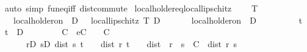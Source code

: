 \begin{isabellebody}
\ {\isacharparenleft}{\kern0pt}auto\ simp{\isacharcolon}{\kern0pt}\ fun{\isacharunderscore}{\kern0pt}eq{\isacharunderscore}{\kern0pt}iff\ dist{\isacharunderscore}{\kern0pt}commute{\isacharparenright}{\kern0pt}%
\endisatagproof
{\isafoldproof}%
%
\isadelimproof
\isanewline
%
\endisadelimproof
\isanewline
{}\isamarkupfalse%
\ local{\isacharunderscore}{\kern0pt}holder{\isacharunderscore}{\kern0pt}{}{\isacharunderscore}{\kern0pt}eq{\isacharunderscore}{\kern0pt}local{\isacharunderscore}{\kern0pt}lipschitz{\isacharcolon}{\kern0pt}\ \isanewline
\ \ \ {\isachardoublequoteopen}T\ {\isasymnoteq}\ {\isacharbraceleft}{\kern0pt}{\isacharbraceright}{\kern0pt}{\isachardoublequoteclose}\isanewline
\ \ \ {\isachardoublequoteopen}local{\isacharunderscore}{\kern0pt}holder{\isacharunderscore}{\kern0pt}on\ {}\ D\ {\isasymphi}\ {\isacharequal}{\kern0pt}\ local{\isacharunderscore}{\kern0pt}lipschitz\ T\ D\ {\isacharparenleft}{\kern0pt}{\isasymlambda}{\isacharunderscore}{\kern0pt}{\isachardot}{\kern0pt}\ {\isasymphi}{\isacharparenright}{\kern0pt}{\isachardoublequoteclose}\isanewline
%
\isadelimproof
%
\endisadelimproof
%
\isatagproof
{}\isamarkupfalse%
\isanewline
\ \ \isamarkupfalse%
\ {\isacharasterisk}{\kern0pt}{\isacharcolon}{\kern0pt}\ {\isachardoublequoteopen}local{\isacharunderscore}{\kern0pt}holder{\isacharunderscore}{\kern0pt}on\ {}\ D\ {\isasymphi}{\isachardoublequoteclose}\isanewline
\ \ \isacommand{{\isacharbraceleft}{\kern0pt}}\isamarkupfalse%
\isanewline
\ \ \ \ \isamarkupfalse%
\ t\ \isamarkupfalse%
\ {\isachardoublequoteopen}t\ {\isasymin}\ D{\isachardoublequoteclose}\isanewline
\ \ \ \ \isamarkupfalse%
\ \isamarkupfalse%
\ {\isasymepsilon}\ C\ \ eC{\isacharcolon}{\kern0pt}\ {\isachardoublequoteopen}{\isasymepsilon}\ {\isachargreater}{\kern0pt}\ {}{\isachardoublequoteclose}\ {\isachardoublequoteopen}C\ {\isasymge}\ {}{\isachardoublequoteclose}\isanewline
\ \ \ \ \ \ {\isachardoublequoteopen}{\isacharparenleft}{\kern0pt}{\isasymforall}r{\isasymin}D{\isachardot}{\kern0pt}\ {\isasymforall}s{\isasymin}D{\isachardot}{\kern0pt}\ dist\ s\ t\ {\isasymle}\ {\isasymepsilon}\ {\isasymand}\ dist\ r\ t\ {\isasymle}\ {\isasymepsilon}\ {\isasymlongrightarrow}\ dist\ {\isacharparenleft}{\kern0pt}{\isasymphi}\ r{\isacharparenright}{\kern0pt}\ {\isacharparenleft}{\kern0pt}{\isasymphi}\ s{\isacharparenright}{\kern0pt}\ {\isasymle}\ C\ {\isacharasterisk}{\kern0pt}\ dist\ r\ s{\isacharparenright}{\kern0pt}{\isachardoublequoteclose}\isanewline

\end{isabellebody}
